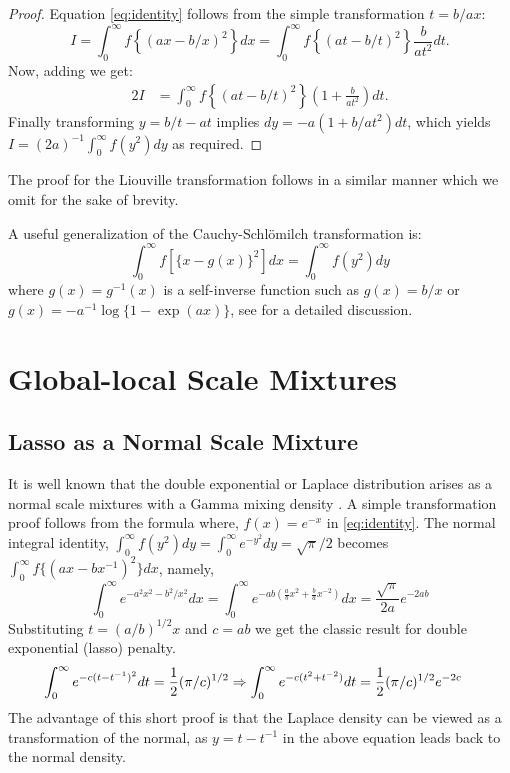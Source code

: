 \documentclass[letterpaper,11pt]{article}
\begin{document}
\begin{proof}
Equation \eqref{eq:identity} follows from the simple transformation $t = b/ax$: 
\begin{equation*}
  I = \int_{0}^{\infty} f \left\{(ax - b/x)^2 \right\} dx = \int_{0}^{\infty} f \left\{(at - b/t)^2 \right\} \frac{b}{at^2} dt.
\end{equation*}
Now, adding we get: 
\begin{align*}
2 I & = \int_{0}^{\infty} f \left\{(at - b/t)^2 \right\} \left( 1+\frac{b}{at^2} \right) dt.
\end{align*}
Finally transforming $y = b/t - at$ implies $dy = -a (1+b/at^2) dt$, which yields $I = (2a)^{-1} \int_{0}^{\infty} f(y^2) dy$ as required. 
\end{proof}
The proof for the Liouville transformation follows in a similar manner which we omit for the sake of brevity. 

A useful generalization of the Cauchy-Schl\"omilch transformation is: 
\begin{equation}
  \int_0^\infty f \left[ \{x-g(x)\}^2 \right] dx = \int_0^\infty f( y^2 ) dy \label{eq:gen}
\end{equation}
where $g(x)=g^{-1}(x)$ is a self-inverse function such as $g(x) = b/x$ or $g(x) = -a^{-1}\log\{1-\exp(a x)\}$, see \citet{amdeberhan2010cauchy} for a detailed discussion. %

\section{Global-local Scale Mixtures}
\subsection{Lasso as a Normal Scale Mixture}
It is well known that the double exponential or Laplace distribution arises as a normal scale mixtures with a Gamma mixing density \citep{andrews1974scale}. A simple transformation proof follows from the \CS formula where, $ f(x) = e^{-x} $ in \eqref{eq:identity}. The normal integral identity, $ \int_{0}^{\infty} f(y^2) dy = \int_0^\infty e^{-y^2} d y = \sqrt{\pi}/2 $ becomes $\int_{0}^{\infty} f\{(ax-bx^{-1})^2\} dx$, namely,
$$
\int_0^\infty e^{- a^2 x^2 - b^2 / x^2 } d x = \int_0^{\infty} e^{-ab \left( \frac{a}{b} x^2 + \frac{b}{a}x^{-2} \right)} dx =  \frac{\sqrt{\pi}}{2a} e^{- 2 ab}
$$
Substituting $ t = (a/b)^{1/2} x $ and $c = ab$ we get the classic \citet{andrews1974scale} result for double exponential (lasso) penalty.  
\begin{align*}
  \int_0^\infty e^{- c (t - t^{-1})^2} d t & = \half (\pi/c)^{1/2} \Rightarrow \int_0^\infty e^{- c (t^2 + t^{-2})} d t = \half (\pi/c)^{1/2} e^{-2c} %
\end{align*}
The advantage of this short proof is that the Laplace density can be viewed as a transformation of the normal, as $y = t - t^{-1}$ in the above equation leads back to the normal density.
\end{document}
